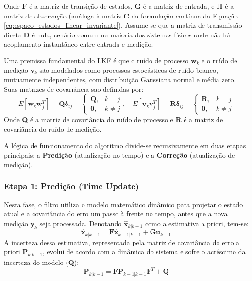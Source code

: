 \documentclass[a4paper,12pt]{article}
\begin{document}
Onde $\mathbf{F}$ é a matriz de transição de estados, $\mathbf{G}$ é a matriz de entrada, e $\mathbf{H}$ é a matriz de observação (análoga à matriz $\mathbf{C}$ da formulação contínua da Equação \ref{eq:espaco_estados_linear_invariante}). Assume-se que a matriz de transmissão direta $\mathbf{D}$ é nula, cenário comum na maioria dos sistemas físicos onde não há acoplamento instantâneo entre entrada e medição.

Uma premissa fundamental do LKF é que o ruído de processo $\mathbf{w}_k$ e o ruído de medição $\mathbf{v}_k$ são modelados como processos estocásticos de ruído branco, mutuamente independentes, com distribuição Gaussiana normal e média zero. Suas matrizes de covariância são definidas por:
\begin{equation}
    E[\mathbf{w}_k \mathbf{w}_j^T] = \mathbf{Q}\mathbf{\delta}_{ij} = \begin{cases} \mathbf{Q}, & k = j \\ \mathbf{0}, & k \neq j \end{cases}, \quad
    E[\mathbf{v}_k \mathbf{v}_j^T] = \mathbf{R}\mathbf{\delta}_{ij} =\begin{cases} \mathbf{R}, & k = j \\ \mathbf{0}, & k \neq j \end{cases}
\end{equation}
Onde $\mathbf{Q}$ é a matriz de covariância do ruído de processo e $\mathbf{R}$ é a matriz de covariância do ruído de medição.

A lógica de funcionamento do algoritmo divide-se recursivamente em duas etapas principais: a \textbf{Predição} (atualização no tempo) e a \textbf{Correção} (atualização de medição).

\subsubsection*{Etapa 1: Predição (Time Update)}
Nesta fase, o filtro utiliza o modelo matemático dinâmico para projetar o estado atual e a covariância do erro um passo à frente no tempo, antes que a nova medição $\mathbf{y}_k$ seja processada. Denotando $\hat{\mathbf{x}}_{k|k-1}$ como a estimativa a priori, tem-se:
\begin{equation}
    \hat{\mathbf{x}}_{k|k-1} = \mathbf{F}\hat{\mathbf{x}}_{k-1|k-1} + \mathbf{G}\mathbf{u}_{k-1}
    \label{eq:kf_pred_estado}
\end{equation}
A incerteza dessa estimativa, representada pela matriz de covariância do erro a priori $\mathbf{P}_{k|k-1}$, evolui de acordo com a dinâmica do sistema e sofre o acréscimo da incerteza do modelo ($\mathbf{Q}$):
\begin{equation}
    \mathbf{P}_{k|k-1} = \mathbf{F}\mathbf{P}_{k-1|k-1}\mathbf{F}^T + \mathbf{Q}
    \label{eq:kf_pred_covariancia}
\end{equation}
\end{document}

